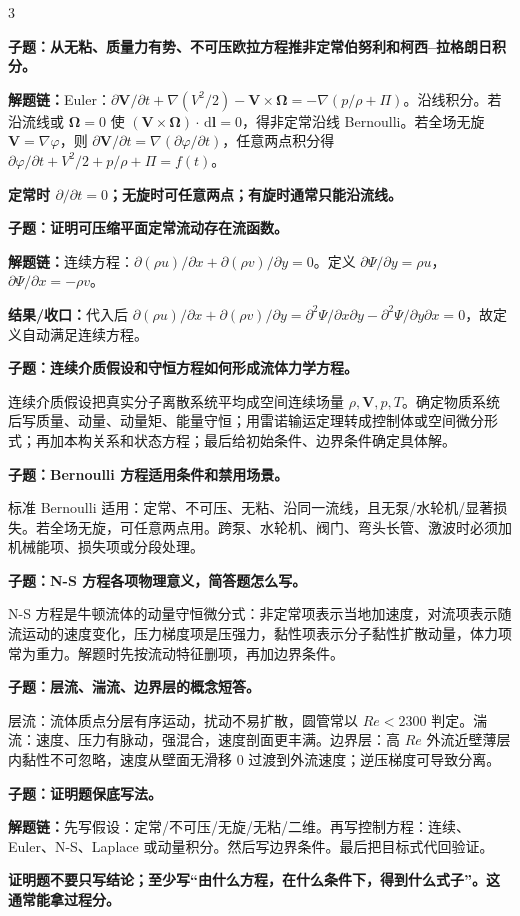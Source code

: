 \documentclass[a4paper]{article}
\newcommand{\qt}[1]{\vspace{1pt}\colorbox{Q}{\parbox{\dimexpr\linewidth-2\fboxsep}{\color{white}\bfseries #1}}\par}
\newcommand{\ans}[1]{\colorbox{G}{\parbox{\dimexpr\linewidth-2\fboxsep}{#1}}\par}
\newcommand{\warn}[1]{\colorbox{Y}{\parbox{\dimexpr\linewidth-2\fboxsep}{\color{E}\bfseries #1}}\par}
\newcommand{\chain}[1]{{\color{A}\bfseries 解题链：}#1\par}
\newcommand{\res}[1]{{\color{E}\bfseries 结果/收口：}#1\par}
\newcommand{\dd}{\,\mathrm d}
\begin{document}
\begin{multicols}{3}
\qt{子题：从无粘、质量力有势、不可压欧拉方程推非定常伯努利和柯西--拉格朗日积分。}
\chain{Euler：$\partial\bm V/\partial t+\nabla(V^2/2)-\bm V\times\bm\Omega=-\nabla(p/\rho+\Pi)$。沿线积分。若沿流线或 $\bm\Omega=0$ 使 $(\bm V\times\bm\Omega)\cdot\dd\bm l=0$，得非定常沿线 Bernoulli。若全场无旋 $\bm V=\nabla\varphi$，则 $\partial\bm V/\partial t=\nabla(\partial\varphi/\partial t)$，任意两点积分得 $\partial\varphi/\partial t+V^2/2+p/\rho+\Pi=f(t)$。}
\warn{定常时 $\partial/\partial t=0$；无旋时可任意两点；有旋时通常只能沿流线。}

\qt{子题：证明可压缩平面定常流动存在流函数。}
\chain{连续方程：$\partial(\rho u)/\partial x+\partial(\rho v)/\partial y=0$。定义 $\partial\Psi/\partial y=\rho u$，$\partial\Psi/\partial x=-\rho v$。}
\res{代入后 $\partial(\rho u)/\partial x+\partial(\rho v)/\partial y=\partial^2\Psi/\partial x\partial y-\partial^2\Psi/\partial y\partial x=0$，故定义自动满足连续方程。}

\qt{子题：连续介质假设和守恒方程如何形成流体力学方程。}
\ans{连续介质假设把真实分子离散系统平均成空间连续场量 $\rho,\bm V,p,T$。确定物质系统后写质量、动量、动量矩、能量守恒；用雷诺输运定理转成控制体或空间微分形式；再加本构关系和状态方程；最后给初始条件、边界条件确定具体解。}

\qt{子题：Bernoulli 方程适用条件和禁用场景。}
\ans{标准 Bernoulli 适用：定常、不可压、无粘、沿同一流线，且无泵/水轮机/显著损失。若全场无旋，可任意两点用。跨泵、水轮机、阀门、弯头长管、激波时必须加机械能项、损失项或分段处理。}

\qt{子题：N-S 方程各项物理意义，简答题怎么写。}
\ans{N-S 方程是牛顿流体的动量守恒微分式：非定常项表示当地加速度，对流项表示随流运动的速度变化，压力梯度项是压强力，黏性项表示分子黏性扩散动量，体力项常为重力。解题时先按流动特征删项，再加边界条件。}

\qt{子题：层流、湍流、边界层的概念短答。}
\ans{层流：流体质点分层有序运动，扰动不易扩散，圆管常以 $Re<2300$ 判定。湍流：速度、压力有脉动，强混合，速度剖面更丰满。边界层：高 $Re$ 外流近壁薄层内黏性不可忽略，速度从壁面无滑移 0 过渡到外流速度；逆压梯度可导致分离。}

\qt{子题：证明题保底写法。}
\chain{先写假设：定常/不可压/无旋/无粘/二维。再写控制方程：连续、Euler、N-S、Laplace 或动量积分。然后写边界条件。最后把目标式代回验证。}
\warn{证明题不要只写结论；至少写“由什么方程，在什么条件下，得到什么式子”。这通常能拿过程分。}


\end{multicols}
\end{document}
